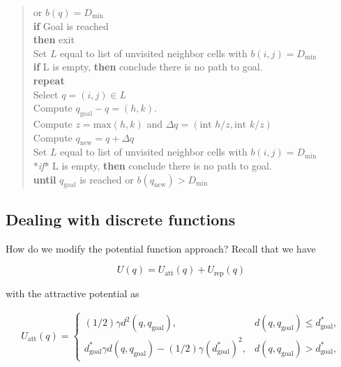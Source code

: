 \begin{quote}
or \(b(q) = D_\text{min}\)\\
\textbf{if} Goal is reached\\
\textbf{then} exit\\
Set \(L\) equal to list of unvisited neighbor cells with
\(b(i,j) = D_\text{min}\)\\
\textbf{if} L is empty, \textbf{then} conclude there is no path to
goal.\\
\textbf{repeat}\\
\hspace*{0.333em}\hspace*{0.333em}Select \(q = (i,j) \in L\)\\
\hspace*{0.333em}\hspace*{0.333em}Compute
\(q_{\text{goal}}-q = (h,k)\).\\
\hspace*{0.333em}\hspace*{0.333em}Compute \(z = \text{max}(h,k)\) and
\(\Delta q =  (\text{int } h/z, \text{int } k/z)\)\\
\hspace*{0.333em}\hspace*{0.333em}Compute
\(q_{\text{new}} = q + \Delta q\)\\
\hspace*{0.333em}\hspace*{0.333em}Set \(L\) equal to list of unvisited
neighbor cells with \(b(i,j) = D_\text{min}\)\\
\hspace*{0.333em}\hspace*{0.333em}*\emph{if}* L is empty, \textbf{then}
conclude there is no path to goal.\\
\textbf{until} \(q_{\text{goal}}\) is reached or
\(b(q_{\text{new}}) > D_\text{min}\)
\end{quote}

\hypertarget{dealing-with-discrete-functions}{%
\subsection{Dealing with discrete
functions}\label{dealing-with-discrete-functions}}

How do we modify the potential function approach? Recall that we have

\[U(q) = U_\text{att}(q) + U_\text{rep}(q)\]

with the attractive potential as

\[\begin{aligned}
U_\text{att}(q) = \left\{ \begin{array}{ll} (1/2)\gamma d^2(q, q_\text{goal}), & d(q, q_\text{goal})\leq d^*_\text{goal},\\[3mm]
d^*_\text{goal}\gamma d(q, q_\text{goal}) - (1/2)\gamma (d^*_\text{goal})^2, & d(q, q_\text{goal})> d^*_\text{goal},
\end{array}\right.
\end{aligned}\]


